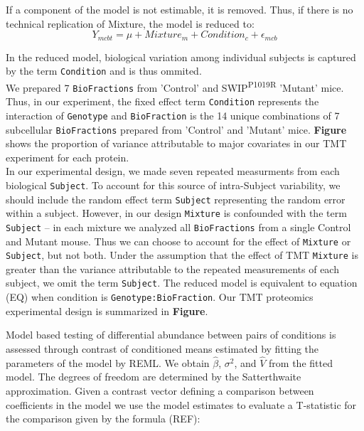 \documentclass[11pt]{elife}\usepackage[]{graphicx}\usepackage[]{color}
\begin{document}
If a component of the model is not estimable, it is removed. Thus, if there is
no technical replication of Mixture, the model is reduced to: \\

\begin{equation} 
	Y_{mcbt} = \mu + Mixture_m + Condition_c + \epsilon_{mcb}
\end{equation}

In the reduced model, biological variation among individual subjects is 
captured by the term \texttt{Condition} and is thus ommited.\\

We prepared 7 \texttt{BioFractions} from 'Control' and 
SWIP\textsuperscript{P1019R} 'Mutant' mice. Thus, in our experiment, 
the fixed effect term \texttt{Condition} represents the interaction 
of \texttt{Genotype} and \texttt{BioFraction} is the 14 unique combinations 
of 7 subcellular \texttt{BioFractions} prepared from 'Control' and 'Mutant' mice. 
\textbf{Figure} shows
the proportion of variance attributable to major covariates in our TMT
experiment for each protein. \\

In our experimental design, we made seven repeated measurments 
from each biological \texttt{Subject}. To account for this source of
intra-Subject variability, we should include the random effect term
\texttt{Subject} representing the  random error within a subject. However, in
our design \texttt{Mixture} is confounded with the term \texttt{Subject} -- in
each mixture we analyzed all \texttt{BioFractions} from a single Control and
Mutant mouse.  Thus we can choose to account for the effect of \texttt{Mixture}
or \texttt{Subject}, but not both. Under the assumption that the effect of TMT
\texttt{Mixture} is greater than the variance attributable to the repeated
measurements of each subject, we omit the term \texttt{Subject}.  The reduced
model is equivalent  to equation (EQ) when condition is
\texttt{Genotype:BioFraction}. Our TMT proteomics experimental design is
summarized in \textbf{Figure}.

Model based testing of differential abundance between pairs of conditions
is assessed through contrast of conditioned means estimated by fitting the
parameters of the model by REML. We obtain $\hat{\beta}$, $\sigma^2$, and
$\hat{V}$ from the fitted model. The degrees of freedom are determined by the 
Satterthwaite approximation. Given a contrast vector defining a comparison 
between coefficients in the model 
we use the model estimates to evaluate a T-statistic for the comparison given by
the formula (REF):\\
\end{document}
